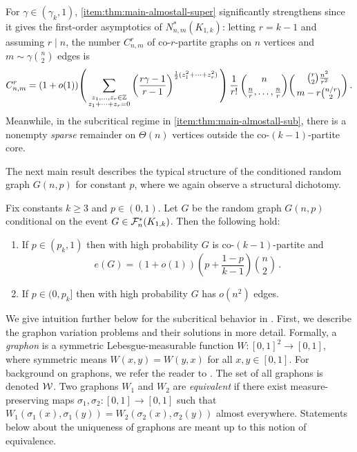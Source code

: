 For $\gamma\in(\gamma_k,1)$,  \ref{item:thm:main-almostall-super} significantly strengthens  since it gives the first-order asymptotics of $N^\ast_{n,m}(K_{1,k})$: letting $r=k-1$ and assuming $r\mid n$, the number $C^r_{n,m}$ of co-$r$-partite graphs on $n$ vertices and $m\sim\gamma\binom{n}{2}$ edges is
$$C^r_{n,m}=(1+o(1))\vast(\sum_{\substack{z_1,\dots,z_r\in\mathbb Z\\ z_1+\cdots+z_r=0}}
\left(\frac{r\gamma-1}{r-1}\right)^{\frac12(z_1^2+\cdots+z_r^2)}\vast)\,\frac{1}{r!}\,
\binom{n}{\frac{n}{r},\dots,\frac{n}{r}}
\binom{\binom{r}{2}\frac{n^2}{r^2}}{\,m-r\binom{n/r}{2}}\,.$$
Meanwhile, in the subcritical regime in  \ref{item:thm:main-almostall-sub}, there is a nonempty \emph{sparse} remainder on $\Theta(n)$ vertices outside the co-$(k-1)$-partite core.

The next main result describes the typical structure of the conditioned \erdosrenyi{} random graph $G(n,p)$ for constant $p$, where we again observe a structural dichotomy.

\begin{theorem}\label{thm:gnp-typ-struc}
Fix constants $k\geq3$ and $p\in(0,1)$. Let $G$ be the \erdosrenyi{} random graph $G(n,p)$ conditional on the event $G\in{\mathcal F}^\ast_n(K_{1,k})$. Then the following hold:
\begin{enumerate}[
  label=\textit{(\roman*)},
  ref=(\textit{\roman*}),
  topsep=5pt
]
	\item If $p\in(p_k,1)$ then with high probability $G$ is co-$(k-1)$-partite and
	$$e(G)=(1+o(1))\left(p+\frac{1-p}{k-1}\right)\binom{n}{2}\,.$$
	\item If $p\in(0,p_k]$ then with high probability $G$ has $o(n^2)$ edges.
\end{enumerate}
\end{theorem}

We give intuition further below for the subcritical behavior in . First, we describe the graphon variation problems and their solutions in more detail. Formally, a \emph{graphon} is a symmetric Lebesgue-measurable function $W:[0,1]^2\to[0,1]$, where symmetric means $W(x,y)=W(y,x)$ for all $x,y\in[0,1]$. For background on graphons, we refer the reader to \cite{lovasz2006limits,borgs2008convergent,lovasz2012large}. The set of all graphons is denoted ${\mathcal W}$. Two graphons $W_1$ and $W_2$ are \emph{equivalent} if there exist measure-preserving maps $\sigma_1,\sigma_2:[0,1]\to[0,1]$ such that $W_1(\sigma_1(x),\sigma_1(y))=W_2(\sigma_2(x),\sigma_2(y))$ almost everywhere. Statements below about the uniqueness of graphons are meant up to this notion of equivalence.

